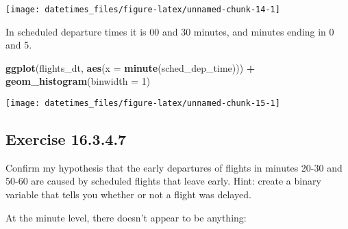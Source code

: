 \documentclass[]{book}
\newenvironment{Shaded}{\begin{snugshade}}{\end{snugshade}}
\newcommand{\DataTypeTok}[1]{\textcolor[rgb]{0.13,0.29,0.53}{#1}}
\newcommand{\DecValTok}[1]{\textcolor[rgb]{0.00,0.00,0.81}{#1}}
\newcommand{\KeywordTok}[1]{\textcolor[rgb]{0.13,0.29,0.53}{\textbf{#1}}}
\newcommand{\NormalTok}[1]{#1}
\newcommand{\OperatorTok}[1]{\textcolor[rgb]{0.81,0.36,0.00}{\textbf{#1}}}
\newcommand{\StringTok}[1]{\textcolor[rgb]{0.31,0.60,0.02}{#1}}
\theoremstyle{plain}
\theoremstyle{remark}
\begin{document}
\begin{Shaded}
\end{Shaded}

\begin{center}\texttt{[image: datetimes\_files/figure-latex/unnamed-chunk-14-1]} \end{center}

In scheduled departure times it is 00 and 30 minutes, and minutes ending
in 0 and 5.

\begin{Shaded}
\begin{Highlighting}[]
\KeywordTok{ggplot}\NormalTok{(flights_dt, }\KeywordTok{aes}\NormalTok{(}\DataTypeTok{x =} \KeywordTok{minute}\NormalTok{(sched_dep_time))) }\OperatorTok{+}
\StringTok{  }\KeywordTok{geom_histogram}\NormalTok{(}\DataTypeTok{binwidth =} \DecValTok{1}\NormalTok{)}
\end{Highlighting}
\end{Shaded}

\begin{center}\texttt{[image: datetimes\_files/figure-latex/unnamed-chunk-15-1]} \end{center}

\hypertarget{exercise-16.3.4.7}{%
\subsection*{\texorpdfstring{Exercise
{16.3.4.7}}{Exercise 16.3.4.7}}\label{exercise-16.3.4.7}}

Confirm my hypothesis that the early departures of flights in minutes
20-30 and 50-60 are caused by scheduled flights that leave early. Hint:
create a binary variable that tells you whether or not a flight was
delayed.

At the minute level, there doesn't appear to be anything:
\end{document}
